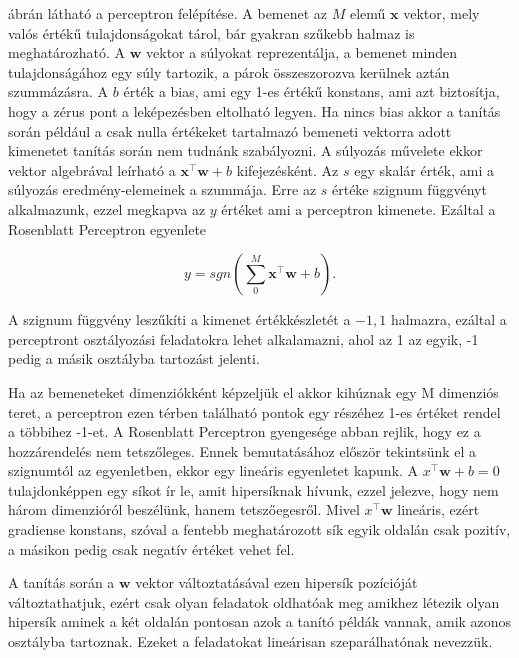  ábrán látható a perceptron felépítése. A bemenet az $M$ elemű $ \boldsymbol x$ vektor, mely valós értékű tulajdonságokat tárol, bár gyakran szűkebb halmaz is meghatározható. A $ \mathbf{w}$ vektor a súlyokat reprezentálja, a bemenet minden tulajdonságához egy súly tartozik, a párok összeszorozva kerülnek aztán szummázásra. A $b$ érték a bias, ami egy 1-es értékű konstans, ami azt biztosítja, hogy a zérus pont a leképezésben eltolható legyen. Ha nincs bias akkor a tanítás során például a csak nulla értékeket tartalmazó bemeneti vektorra adott kimenetet tanítás során nem tudnánk szabályozni. A súlyozás művelete ekkor vektor algebrával leírható a $\boldsymbol x^\intercal \boldsymbol w + b$ kifejezésként. Az $s$ egy skalár érték, ami a súlyozás eredmény-elemeinek a szummája. Erre az $s$ értéke szignum függvényt alkalmazunk, ezzel megkapva az $y$ értéket ami a perceptron kimenete. Ezáltal a Rosenblatt Perceptron egyenlete

\begin{equation}
y = sgn\left( \sum_0^M \boldsymbol x^\intercal \boldsymbol w + b\right) .
\end{equation} 

A szignum függvény leszűkíti a kimenet értékkészletét a ${-1,1}$ halmazra, ezáltal a perceptront osztályozási feladatokra lehet alkalamazni, ahol az 1 az egyik, -1 pedig a másik osztályba tartozást jelenti.

Ha az bemeneteket dimenziókként képzeljük el akkor kihúznak egy M dimenziós teret, a perceptron ezen térben található pontok egy részéhez 1-es értéket rendel a többihez -1-et. A Rosenblatt Perceptron gyengesége abban rejlik, hogy ez a hozzárendelés nem tetszőleges. Ennek bemutatásához először tekintsünk el a szignumtól az egyenletben, ekkor egy lineáris egyenletet kapunk. A 
$x^\intercal \boldsymbol w + b = 0$ tulajdonképpen egy síkot ír le, amit hipersíknak hívunk, ezzel jelezve, hogy nem három dimenzióról beszélünk, hanem tetszőegesről. Mivel $x^\intercal \boldsymbol w$ lineáris, ezért gradiense konstans, szóval a fentebb meghatározott sík egyik oldalán csak pozitív, a másikon pedig csak negatív értéket vehet fel.

A tanítás során a $\boldsymbol w$ vektor változtatásával ezen hipersík pozícióját változtathatjuk, ezért csak olyan feladatok oldhatóak meg amikhez létezik olyan hipersík aminek a két oldalán pontosan azok a tanító példák vannak, amik azonos osztályba tartoznak. Ezeket a feladatokat lineárisan szeparálhatónak nevezzük.

